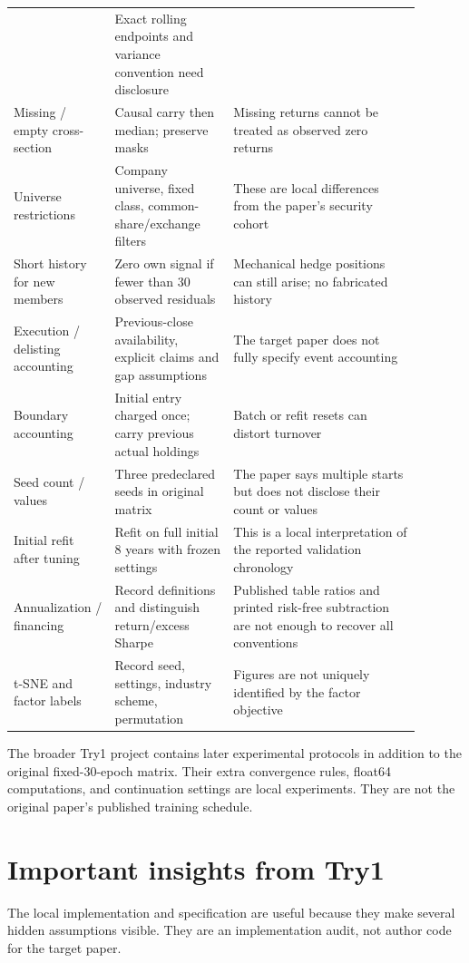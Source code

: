 \documentclass[11pt]{article}
\begin{document}
\begin{longtable}{p{0.22\linewidth}p{0.26\linewidth}p{0.41\linewidth}}
& Exact rolling endpoints and variance convention need disclosure\\
Missing / empty cross-section & Causal carry then median; preserve masks
& Missing returns cannot be treated as observed zero returns\\
Universe restrictions & Company universe, fixed class, common-share/exchange filters
& These are local differences from the paper's security cohort\\
Short history for new members & Zero own signal if fewer than 30 observed residuals
& Mechanical hedge positions can still arise; no fabricated history\\
Execution / delisting accounting & Previous-close availability, explicit claims and gap assumptions
& The target paper does not fully specify event accounting\\
Boundary accounting & Initial entry charged once; carry previous actual holdings
& Batch or refit resets can distort turnover\\
Seed count / values & Three predeclared seeds in original matrix
& The paper says multiple starts but does not disclose their count or values\\
Initial refit after tuning & Refit on full initial 8 years with frozen settings
& This is a local interpretation of the reported validation chronology\\
Annualization / financing & Record definitions and distinguish return/excess Sharpe
& Published table ratios and printed risk-free subtraction are not enough to recover all conventions\\
t-SNE and factor labels & Record seed, settings, industry scheme, permutation
& Figures are not uniquely identified by the factor objective\\
\bottomrule
\end{longtable}
\normalsize

The broader Try1 project contains later experimental protocols in
addition to the original fixed-30-epoch matrix. Their extra convergence
rules, float64 computations, and continuation settings are local
experiments. They are not the original paper's published training
schedule.

\section{Important insights from Try1}
\label{sec:try1-insights}

The local implementation and specification are useful because they
make several hidden assumptions visible. They are an implementation
audit, not author code for the target paper.
\end{document}
